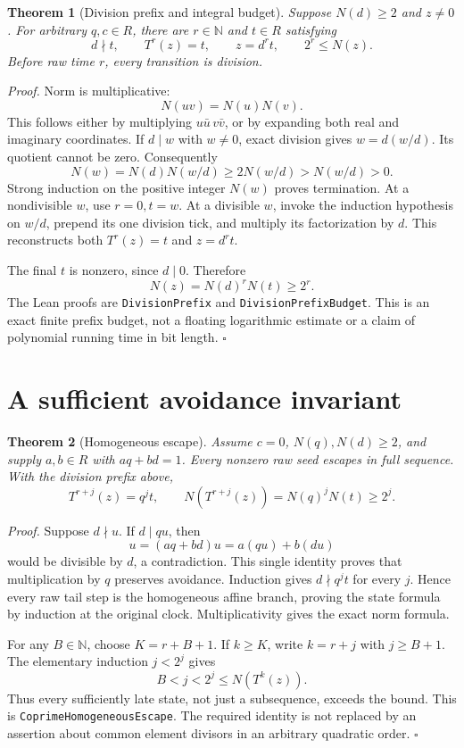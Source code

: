 \documentclass[11pt,letterpaper]{article}
\newcommand{\N}{\mathbb{N}}
\newtheorem{theorem}{Theorem}
\newenvironment{proof}{\noindent\textit{Proof.}}{\hfill\(\square\)}
\begin{document}
\begin{theorem}[Division prefix and integral budget]
Suppose \(N(d)\ge2\) and \(z\ne0\). For arbitrary \(q,c\in R\), there are \(r\in\N\) and \(t\in R\) satisfying
\[
d\nmid t,\qquad T^r(z)=t,\qquad z=d^rt,\qquad 2^r\le N(z).
\]
Before raw time \(r\), every transition is division.
\end{theorem}
\begin{proof}
Norm is multiplicative:
\[
N(uv)=N(u)N(v).
\]
This follows either by multiplying \(u\bar u\,v\bar v\), or by expanding both real and imaginary coordinates. If \(d\mid w\) with \(w\ne0\), exact division gives \(w=d(w/d)\). Its quotient cannot be zero. Consequently
\[
N(w)=N(d)N(w/d)\ge2N(w/d)>N(w/d)>0.
\]
Strong induction on the positive integer \(N(w)\) proves termination. At a nondivisible \(w\), use \(r=0,t=w\). At a divisible \(w\), invoke the induction hypothesis on \(w/d\), prepend its one division tick, and multiply its factorization by \(d\). This reconstructs both \(T^r(z)=t\) and \(z=d^rt\).

The final \(t\) is nonzero, since \(d\mid0\). Therefore
\[
N(z)=N(d)^rN(t)\ge2^r.
\]
The Lean proofs are \texttt{DivisionPrefix} and \texttt{DivisionPrefixBudget}. This is an exact finite prefix budget, not a floating logarithmic estimate or a claim of polynomial running time in bit length.
\end{proof}

\section{A sufficient avoidance invariant}

\begin{theorem}[Homogeneous escape]
Assume \(c=0\), \(N(q),N(d)\ge2\), and supply \(a,b\in R\) with \(aq+bd=1\). Every nonzero raw seed escapes in full sequence. With the division prefix above,
\[
T^{r+j}(z)=q^jt,\qquad
N(T^{r+j}(z))=N(q)^jN(t)\ge2^j.
\]
\end{theorem}
\begin{proof}
Suppose \(d\nmid u\). If \(d\mid qu\), then
\[
u=(aq+bd)u=a(qu)+b(du)
\]
would be divisible by \(d\), a contradiction. This single identity proves that multiplication by \(q\) preserves avoidance. Induction gives \(d\nmid q^jt\) for every \(j\). Hence every raw tail step is the homogeneous affine branch, proving the state formula by induction at the original clock. Multiplicativity gives the exact norm formula.

For any \(B\in\N\), choose \(K=r+B+1\). If \(k\ge K\), write \(k=r+j\) with \(j\ge B+1\). The elementary induction \(j<2^j\) gives
\[
B<j<2^j\le N(T^k(z)).
\]
Thus every sufficiently late state, not just a subsequence, exceeds the bound. This is \texttt{CoprimeHomogeneousEscape}. The required identity is not replaced by an assertion about common element divisors in an arbitrary quadratic order.
\end{proof}
\end{document}
